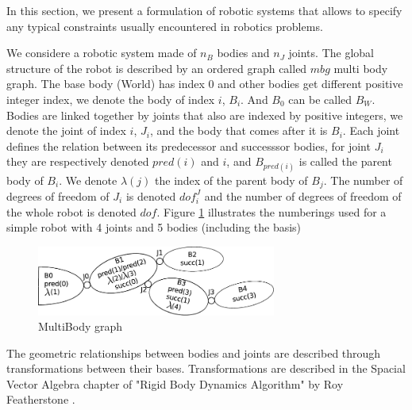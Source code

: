 In this section, we present a formulation of robotic systems that allows to specify any typical constraints usually encountered in robotics problems.

We considere a robotic system made of $n_B$ bodies and $n_J$ joints.
The global structure of the robot is described by an ordered graph called $mbg$ multi body graph.
The base body (World) has index $0$ and other bodies get different positive integer index, we denote the body of index $i$, $B_i$. And $B_0$ can be called $B_W$.
Bodies are linked together by joints that also are indexed by positive integers, we denote the joint of index $i$, $J_i$, and the body that comes after it is $B_i$.
Each joint defines the relation between its predecessor and successsor bodies, for joint $J_i$ they are respectively denoted $pred(i)$ and $i$, and $B_{pred(i)}$ is called the parent body of $B_{i}$.
We denote $\lambda(j)$ the index of the parent body of $B_j$.
The number of degrees of freedom of $J_i$ is denoted $dof^J_i$ and the number of degrees of freedom of the whole robot is denoted $dof$.
Figure \ref{fig:mbg} illustrates the numberings used for a simple robot with 4 joints and 5 bodies (including the basis)

\begin{figure}
  \centering
  \includegraphics[width=0.7\textwidth]{mbg.pdf}
  \caption{MultiBody graph}
  \label{fig:mbg}
\end{figure}

The geometric relationships between bodies and joints are described through transformations between their bases. Transformations are described in the Spacial Vector Algebra chapter of "Rigid Body Dynamics Algorithm" by Roy Featherstone \cite{featherstone:book:2007}.

